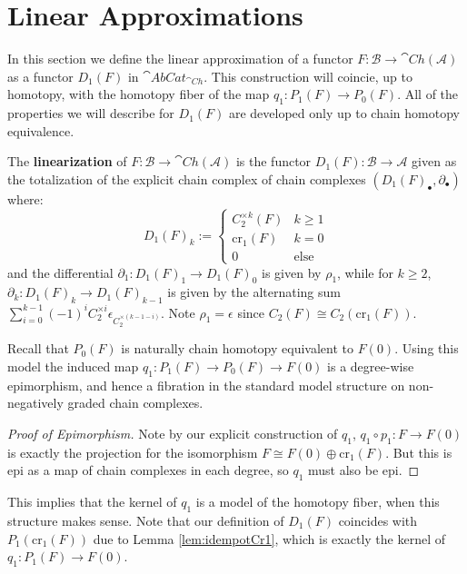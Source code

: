 \section{Linear Approximations}


In this section we define the linear approximation of a functor $F:\mathcal{B}\rightarrow \cat{Ch}(\mathcal{A})$ as a functor $D_1(F)$ in $\cat{AbCat}_{\cat{Ch}}$. This construction will coincie, up to homotopy, with the homotopy fiber of the map $q_1:P_1(F)\to P_0(F)$. All of the properties we will describe for $D_1(F)$ are developed only up to  chain homotopy equivalence.

\begin{defn}[label=defn:linearization]
    The \textbf{linearization} of $F:\mathcal{B}\rightarrow \cat{Ch}(\mathcal{A})$ is the functor $D_1(F):\mathcal{B}\rightarrow \mathcal{A}$ given as the totalization of the explicit chain complex of chain complexes $(D_1(F)_\bullet,\partial_\bullet)$ where:
    \begin{equation*}
        D_1(F)_k := \left\{\begin{array}{cc} C_2^{\times k}(F) & k \geq 1 \\ \text{cr}_1(F) & k = 0 \\ 0 & \text{else} \end{array}\right.
    \end{equation*}
    and the differential $\partial_1:D_1(F)_1\rightarrow D_1(F)_0$ is given by $\rho_1$, while for $k \geq 2$, $\partial_k:D_1(F)_k\rightarrow D_1(F)_{k-1}$ is given by the alternating sum $\sum_{i=0}^{k-1}(-1)^iC_2^{\times i}\epsilon_{C_2^{\times (k-1-i)}}$. Note $\rho_1 = \epsilon$ since $C_2(F) \cong C_2(\text{cr}_1(F))$.
\end{defn}

Recall that $P_0(F)$ is naturally chain homotopy equivalent to $F(0)$. Using this model the induced map $q_1:P_1(F)\to P_0(F)\to F(0)$ is a degree-wise epimorphism, and hence a fibration in the standard model structure on non-negatively graded chain complexes.

\begin{proof}[Proof of Epimorphism]
    Note by our explicit construction of $q_1$, $q_1\circ p_1:F\to F(0)$ is exactly the projection for the isomorphism $F \cong F(0)\oplus \text{cr}_1(F)$. But this is epi as a map of chain complexes in each degree, so $q_1$ must also be epi.
\end{proof}

This implies that the kernel of $q_1$ is a model of the homotopy fiber, when this structure makes sense. Note that our definition of $D_1(F)$ coincides with $P_1(\text{cr}_1(F))$ due to Lemma \ref{lem:idempotCr1}, which is exactly the kernel of $q_1:P_1(F)\to F(0)$. 

